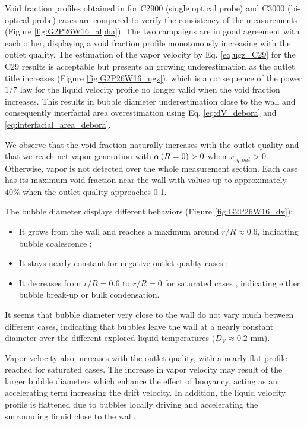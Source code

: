 Void fraction profiles obtained in for C2900 (single optical probe) and C3000 (bi-optical probe) cases are compared to verify the consistency of the measurements (Figure \ref{fig:G2P26W16_alpha}). The two campaigns are in good agreement with each other, displaying a void fraction profile monotonously increasing with the outlet quality. The estimation of the vapor velocity by Eq. \ref{eq:ugz_C29} for the C29 results is acceptable but presents an growing underestimation as the outlet title increases (Figure \ref{fig:G2P26W16_ugz}), which is a consequence of the power $1/7$ law for the liquid velocity profile no longer valid when the void fraction increases. This results in bubble diameter underestimation close to the wall and consequently interfacial area overestimation using Eq. \ref{eq:dV_debora} and \ref{eq:interfacial_area_debora}.  

\npar

We observe that the void fraction naturally increases with the outlet quality and that we reach net vapor generation with $\alpha\left( R=0 \right) > 0$ when $x_{eq,out}>0$. Otherwise, vapor is not detected over the whole measurement section. Each case has its maximum void fraction near the wall with values up to approximately $40\%$ when the outlet quality approaches 0.1.

\npar

The bubble diameter displays different behaviors (Figure \ref{fig:G2P26W16_dv}): 

\begin{itemize}
\item It grows from the wall and reaches a maximum around $r/R \approx 0.6$, indicating bubble coalescence ;
\item It stays nearly constant for negative outlet quality cases ;
\item It decreases from $r/R = 0.6$ to $r/R = 0$ for saturated cases , indicating either bubble break-up or bulk condensation.
\end{itemize}

\begin{remark*}{}
It seems that bubble diameter very close to the wall do not vary much between different cases, indicating that bubbles leave the wall at a nearly constant diameter over the different explored liquid temperatures ($D_{V} \approx 0.2$ mm).
\end{remark*}

\npar

Vapor velocity also increases with the outlet quality, with a nearly flat profile reached for saturated cases. The increase in vapor velocity may result of the larger bubble diameters which enhance the effect of buoyancy, acting as an accelerating term increasing the drift velocity. In addition, the liquid velocity profile is flattened due to bubbles locally driving and accelerating the surrounding liquid close to the wall.

